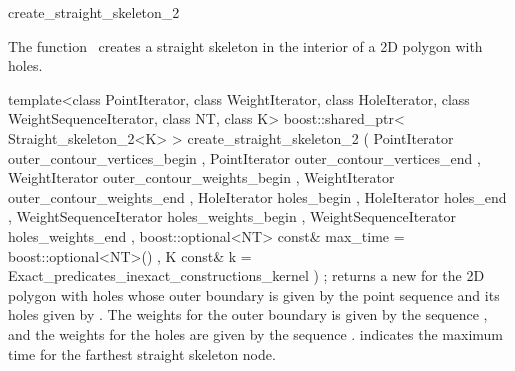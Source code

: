 

\begin{ccRefFunction}{create_straight_skeleton_2}


\ccDefinition

The function \ccRefName\ creates a straight skeleton in the interior of a 2D polygon with holes.


\ccFunction
{template<class PointIterator, class WeightIterator, class HoleIterator, class WeightSequenceIterator, class NT, class K>
boost::shared_ptr< Straight_skeleton_2<K> >
create_straight_skeleton_2 ( PointIterator              outer_contour_vertices_begin
                           , PointIterator              outer_contour_vertices_end
                           , WeightIterator             outer_contour_weights_begin
                           , WeightIterator             outer_contour_weights_end
                           , HoleIterator               holes_begin
                           , HoleIterator               holes_end
                           , WeightSequenceIterator     holes_weights_begin
                           , WeightSequenceIterator     holes_weights_end
                           , boost::optional<NT> const& max_time = boost::optional<NT>()  
                           , K const&                   k        = Exact_predicates_inexact_constructions_kernel          
                          ) ;
}
{returns a new  for the 2D polygon with holes whose outer boundary is given by the point sequence 
and its holes given by . The weights for the outer boundary is given by the sequence ,
and the weights for the holes are given by the sequence .  indicates the maximum time for the farthest straight skeleton node.
}


\end{ccRefFunction}
